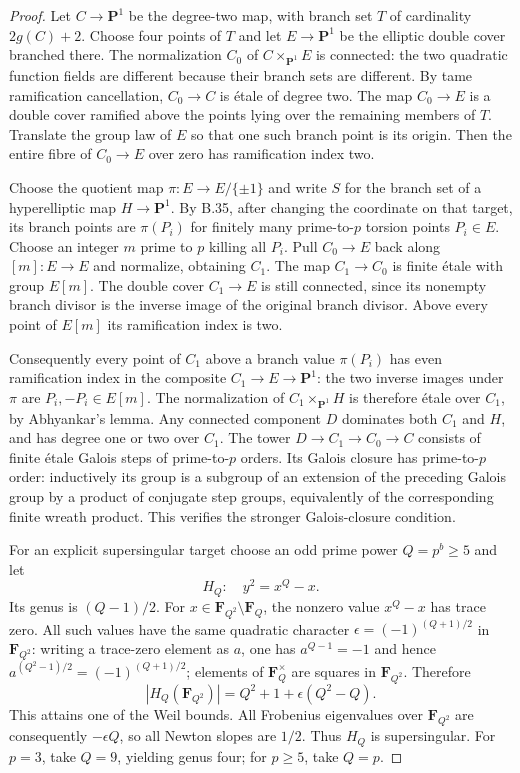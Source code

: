 \documentclass[11pt,a4paper]{article}
\newcommand{\F}{\mathbf F}
\begin{document}
\begin{proof}
Let $C\to\mathbf P^1$ be the degree-two map, with branch set $T$
of cardinality $2g(C)+2$. Choose four points of $T$ and let
$E\to\mathbf P^1$ be the elliptic double cover branched there.
The normalization $C_0$ of $C\times_{\mathbf P^1}E$ is connected:
the two quadratic function fields are different because their
branch sets are different. By tame ramification cancellation,
$C_0\to C$ is \'etale of degree two. The map $C_0\to E$ is a
double cover ramified above the points lying over the remaining
members of $T$. Translate the group law of $E$ so that one such
branch point is its origin. Then the entire fibre of $C_0\to E$
over zero has ramification index two.

Choose the quotient map $\pi:E\to E/\{\pm1\}$ and write $S$
for the branch set of a hyperelliptic map $H\to\mathbf P^1$.
By B.35, after changing the coordinate on that target, its branch
points are $\pi(P_i)$ for finitely many prime-to-$p$ torsion points
$P_i\in E$. Choose an integer $m$ prime to $p$ killing all $P_i$.
Pull $C_0\to E$ back along $[m]:E\to E$ and normalize, obtaining
$C_1$. The map $C_1\to C_0$ is finite \'etale with group $E[m]$.
The double cover $C_1\to E$ is still connected, since its nonempty
branch divisor is the inverse image of the original branch divisor.
Above every point of $E[m]$ its ramification index is two.

Consequently every point of $C_1$ above a branch value $\pi(P_i)$
has even ramification index in the composite $C_1\to E\to\mathbf P^1$:
the two inverse images under $\pi$ are $P_i,-P_i\in E[m]$.
The normalization of $C_1\times_{\mathbf P^1}H$ is therefore
\'etale over $C_1$, by Abhyankar's lemma. Any connected component
$D$ dominates both $C_1$ and $H$, and has degree one or two over
$C_1$. The tower $D\to C_1\to C_0\to C$ consists of finite
\'etale Galois steps of prime-to-$p$ orders. Its Galois closure has
prime-to-$p$ order: inductively its group is a subgroup of an
extension of the preceding Galois group by a product of conjugate
step groups, equivalently of the corresponding finite wreath
product. This verifies the stronger Galois-closure condition.

For an explicit supersingular target choose an odd prime power
$Q=p^b\ge5$ and let
\[
 H_Q:\quad y^2=x^Q-x.
\]
Its genus is $(Q-1)/2$. For $x\in\F_{Q^2}\setminus\F_Q$, the
nonzero value $x^Q-x$ has trace zero. All such values have the same
quadratic character
$\epsilon=(-1)^{(Q+1)/2}$ in $\F_{Q^2}$: writing a trace-zero
element as $a$, one has $a^{Q-1}=-1$ and hence
$a^{(Q^2-1)/2}=(-1)^{(Q+1)/2}$; elements of $\F_Q^\times$ are
squares in $\F_{Q^2}$. Therefore
\[
 |H_Q(\F_{Q^2})|=Q^2+1+\epsilon(Q^2-Q).
\]
This attains one of the Weil bounds. All Frobenius eigenvalues
over $\F_{Q^2}$ are consequently $-\epsilon Q$, so all Newton
slopes are $1/2$. Thus $H_Q$ is supersingular. For $p=3$, take
$Q=9$, yielding genus four; for $p\ge5$, take $Q=p$.
\end{proof}
\end{document}
